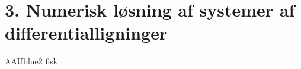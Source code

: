 \section*{3. Numerisk løsning af systemer af differentialligninger}
% 
%
\begin{color}{AAUblue2}
%
fisk
% 
\end{color}
\\\\
% 
%
